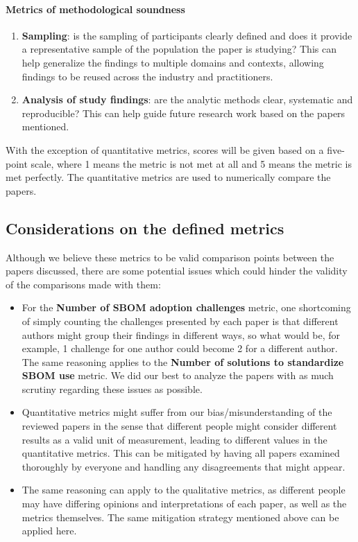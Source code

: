 \paragraph{Metrics of methodological soundness}
\begin{enumerate}
    \setcounter{enumi}{\value{metrics}}

    \item \textbf{Sampling}: is the sampling of participants clearly defined and does it provide a representative sample of the population the paper is studying? This can help generalize the findings to multiple domains and contexts, allowing findings to be reused across the industry and practitioners.
    \item \textbf{Analysis of study findings}: are the analytic methods clear, systematic and reproducible? This can help guide future research work based on the papers mentioned.

    \setcounter{metrics}{\value{enumi}}
\end{enumerate}


With the exception of quantitative metrics, scores will be given based on a five-point scale, where 1 means the metric is not met at all and 5 means the metric is met perfectly. The quantitative metrics are used to numerically compare the papers.

\subsection{Considerations on the defined metrics}

Although we believe these metrics to be valid comparison points between the papers discussed, there are some potential issues which could hinder the validity of the comparisons made with them:
\begin{itemize}
    \item For the \textbf{Number of SBOM adoption challenges} metric, one shortcoming of simply counting the challenges presented by each paper is that different authors might group their findings in different ways, so what would be, for example, 1 challenge for one author could become 2 for a different author. The same reasoning applies to the \textbf{Number of solutions to standardize SBOM use} metric. We did our best to analyze the papers with as much scrutiny regarding these issues as possible.
    \item Quantitative metrics might suffer from our bias/misunderstanding of the reviewed papers in the sense that different people might consider different results as a valid unit of measurement, leading to different values in the quantitative metrics. This can be mitigated by having all papers examined thoroughly by everyone and handling any disagreements that might appear.
    \item The same reasoning can apply to the qualitative metrics, as different people may have differing opinions and interpretations of each paper, as well as the metrics themselves. The same mitigation strategy mentioned above can be applied here.
\end{itemize}
